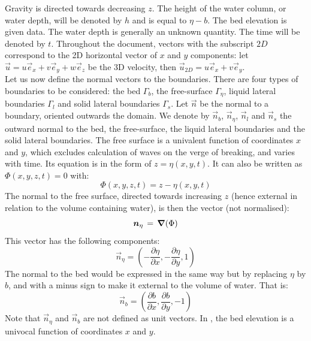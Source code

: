 Gravity is directed towards decreasing $z$.
The height of the water column, or water depth, will be denoted by $h$ and is
equal to $\eta-b$.
The bed elevation is given data. The water depth is generally an unknown quantity.
The time will be denoted by $t$. Throughout the document, vectors with the subscript ${2D}$
correspond to the 2D horizontal vector
of $x$ and $y$ components: let $\vec{u}=u \vec{e}_x+v \vec{e}_y+w\vec{e}_z$ be the 3D velocity, then
$\vec{u}_{2D}= u \vec{e}_x+v \vec{e}_y$.\\

Let us now define the normal vectors to the boundaries.
There are four types of boundaries to be considered: the bed $\Gamma_b$,
the free-surface $\Gamma_\eta$, liquid lateral boundaries $\Gamma_l$ and solid
lateral boundaries $\Gamma_s$. Let $\vec{n}$ be the normal to a boundary, oriented outwards the domain.
We denote by $\vec{n}_b$, $\vec{n}_\eta$, $\vec{n}_l$ and $\vec{n}_s$ the outward normal to the bed,
the free-surface, the liquid lateral boundaries and the solid lateral boundaries.
The free surface is a univalent function of coordinates $x$ and $y$, which
excludes calculation of waves on the verge of breaking, and varies with time.
Its equation is in the form of $z=\eta(x,y,t)$. It can also be written as
$\Phi(x,y,z,t)=0$ with:%
\begin{equation}
  \Phi(x,y,z,t)=z-\eta(x,y,t)
\end{equation}
The normal to the free surface, directed towards increasing $z$ (hence
external in relation to the volume containing water), is then the vector (not normalised):%
\begin{equation}
\bm{n}_{\eta}\,=\,\bm{\nabla}(\Phi)
\end{equation}
This vector has the following components:
\begin{equation}
  \vec{n}_{\eta} =\left(  -\dfrac{\partial \eta}{\partial x},-\dfrac{\partial \eta%
    }{\partial y},1\right)
\end{equation}
The normal to the bed would be expressed in the same way but by replacing
$\eta$ by $b$, and with a minus sign to make it external to the volume of
water. That is:%
\begin{equation}
  \vec{n}_{b}=\left(  \dfrac{\partial b}{\partial x},\dfrac{\partial b%
    }{\partial y},-1\right)
\end{equation}
Note that $\vec{n}_{\eta}$ and $\vec{n}_{b}$ are not defined as unit vectors.
In , the bed elevation is a univocal function of coordinates $x$ and $y$.

